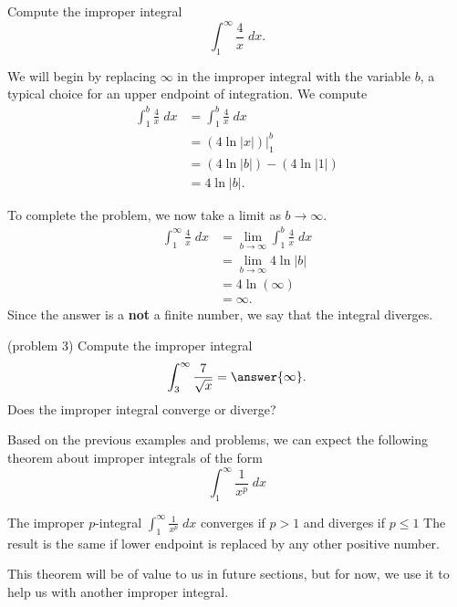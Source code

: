 \documentclass{ximera}
\begin{document}
\begin{example}[example 3]
Compute the improper integral
\[
\int_1^\infty \frac{4}{x} \; dx.
\]

We will begin by replacing $\infty$ in the improper integral with the variable $b$, a typical choice for an upper endpoint of integration.
We compute
\begin{align*}
\int_1^b \frac{4}{x} \; dx &= \int_1^b \frac{4}{x} \; dx\\
                           &= \left(4\ln|x| \right) \bigg|_1^b\\
                       &= \left(4\ln|b| \right) - \left(4\ln|1| \right)\\
                       &=4\ln|b|.
\end{align*}
                       
To complete the problem, we now take a limit as $b \to \infty$.
\begin{align*}
\int_1^\infty \frac{4}{x} \; dx &= \lim_{b \to \infty}\int_1^b \frac{4}{x} \; dx\\
                       &=\lim_{b \to \infty} 4\ln|b|\\
                       &= 4\ln(\infty)\\
                       &= \infty.
\end{align*}
Since the answer is a \textbf{not} a finite number, we say that the integral diverges.

\end{example}


\begin{problem}(problem 3)
Compute the improper integral
\[
\int_3^\infty \frac{7}{\sqrt x} = \answer{\infty}.
\]
Does the improper integral converge or diverge?
\begin{multipleChoice}
\end{multipleChoice}
\end{problem}

Based on the previous examples and problems, we can expect the following theorem about improper integrals of the form
\[
\int_1^\infty \frac{1}{x^p} \; dx
\]

\begin{theorem}[$p$-integrals]
The improper $p$-integral $\int_1^\infty \frac{1}{x^p} \; dx$
 converges if $p>1$ and diverges if $p \leq 1$
The result is the same if lower endpoint is replaced by any other positive number.
\end{theorem}
This theorem will be of value to us in future sections, but for now, we use it to help us with another improper integral.
\end{document}
